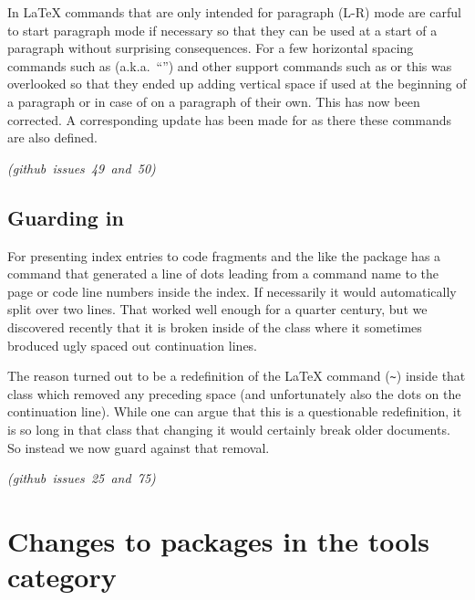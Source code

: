 \documentclass{ltnews}
\newcommand\githubissue[2][]{\ifhmode\unskip\fi
     \quad\penalty500\strut\nobreak\hfill
     \mbox{\small\itshape(github issue#1 #2)}\par}
\let\cls\pkg
\begin{document}
In \LaTeX{} commands that are only intended for paragraph (L-R) mode
are carful to start paragraph mode if necessary so that they can be
used at a start of a paragraph without surprising consequences. For a
few horizontal spacing commands such as 
(a.k.a.\ ``\cs{,}'') and other support commands such as  or
 this was overlooked so that they ended up adding vertical
space if used at the beginning of a paragraph or in case of 
on a paragraph of their own. This has now been corrected.  A
corresponding update has been made for  as there these
commands are also defined.
%
\githubissue[s]{49 and 50}
        

        
\subsection{Guarding  in }

For presenting index entries to code fragments and the like the
 package has a  command that generated a line of
dots leading from a command name to the page or code line numbers
inside the index. If necessarily it would automatically split over two
lines. That worked well enough for a quarter century, but we
discovered recently that it is broken inside of the \cls{ltugboat}
class where it sometimes broduced ugly spaced out continuation lines.

The reason turned out to be a redefinition of the \LaTeX{} command
 (\verb=~=) inside that class which removed any
preceding space (and unfortunately also the dots on the continuation
line). While one can argue that this is a questionable redefinition,
it is so long in that class that changing it would certainly break
older documents. So instead we now guard against that removal.
%
\githubissue[s]{25 and 75}

        


        
\section{Changes to packages in the tools category}

\subsection{}
\end{document}
